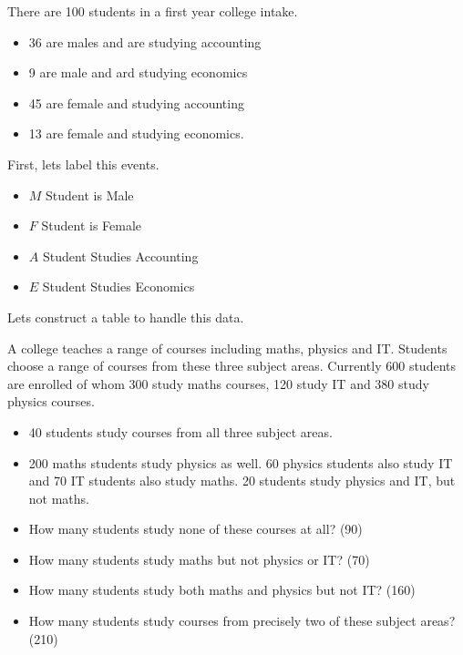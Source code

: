 \documentclass[]{report}
\begin{document}
There are 100 students in a first year college intake. 
\begin{itemize}
\item 36 are males and are studying accounting
\item 9 are male and ard studying economics
\item 45 are female and studying accounting
\item 13 are female and studying economics.

\end{itemize}

First, lets label this events.

\begin{itemize}
\item $M$ Student is Male
\item $F$ Student is Female
\item $A$ Student Studies Accounting
\item $E$ Student Studies Economics
\end{itemize}

Lets construct a table to handle this data.




A college teaches a range of courses including maths, physics and IT.
Students choose a range of courses from these three subject areas. Currently 600
students are enrolled of whom 300 study maths courses, 120 study IT
and 380 study physics courses. 

\begin{itemize}
	\item 40 students study courses from all three subject
	areas. 
	\item 200 maths students study physics as well. 60 physics students
	also study IT and 70 IT students also study maths. 20 students study physics and IT, but not maths.
\end{itemize}



\begin{itemize}
	\item How many students study none of these courses at all? (90)
	
	\item How many students study maths but not physics or IT? (70)
	
	\item How many students study both maths and physics but not IT? (160)
	
	\item How many students study courses from precisely two of these subject
	areas? (210)
\end{itemize}
\end{document}
